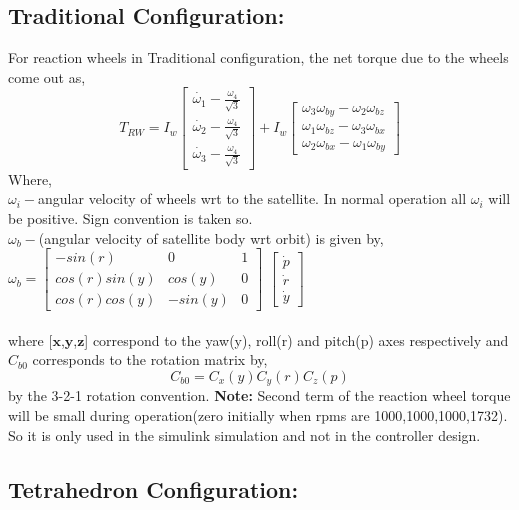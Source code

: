 \documentclass[10pt,a4paper]{report}
\begin{document}
\subsection{Traditional Configuration:}
For reaction wheels in Traditional configuration, the net torque due to the wheels come out as,
\begin{equation}
T_{RW}=I_{w}\begin{bmatrix}
\dot{\omega_{1}}-\frac{\omega_{4}}{\sqrt{3}}\\
\dot{\omega_{2}}-\frac{\omega_{4}}{\sqrt{3}}\\
\dot{\omega_{3}}-\frac{\omega_{4}}{\sqrt{3}}
\end{bmatrix}
+I_{w}\begin{bmatrix}
\omega_{3}\omega_{by}-\omega_{2}\omega_{bz}\\
\omega_{1}\omega_{bz}-\omega_{3}\omega_{bx}\\
\omega_{2}\omega_{bx}-\omega_{1}\omega_{by}
\end{bmatrix}
\end{equation}
Where, \\
$\omega_{i}-$angular velocity of wheels wrt to the satellite. In normal operation all $\omega_{i}$ will be positive. Sign convention is taken so. \\
$ \omega_{b}- $(angular velocity of satellite body wrt orbit) is given by,\\
$
\omega_{b} =\begin{bmatrix}
-sin(r) & 0 & 1\\
cos(r) sin(y)&cos(y)&0\\
cos(r) cos(y)&-sin(y)&0
\end{bmatrix}
$ $
\begin{bmatrix}
\dot{p}\\ \dot{r} \\ \dot{y}
\end{bmatrix}
 $\\ \\
where [$\textbf{x}$,$\textbf{y}$,$\textbf{z}$]  correspond to the yaw(y), roll(r) and pitch(p) axes respectively and $ C_{b0} $ corresponds to the rotation matrix by,
\begin{equation}
C_{b0}=C_{x}(y)C_{y}(r)C_{z}(p)
\end{equation}
by the 3-2-1 rotation convention.
\newpage
\textbf{Note:} Second term of the reaction wheel torque will be small during operation(zero initially when rpms are 1000,1000,1000,1732). So it is only used in the simulink simulation and not in the controller design.
\subsection{Tetrahedron Configuration:}
\end{document}
